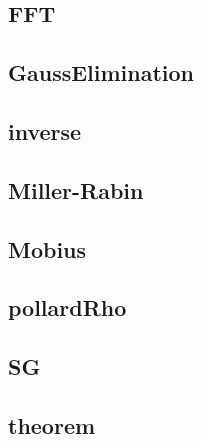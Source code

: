 	\subsection{FFT}
		
%		
	\subsection{GaussElimination}
		
	\subsection{inverse}
		
%		
%		
	\subsection{Miller-Rabin}
		
	\subsection{Mobius}
		
	\subsection{pollardRho}
		
%		
	\subsection{SG}
		
	\subsection{theorem}
		

